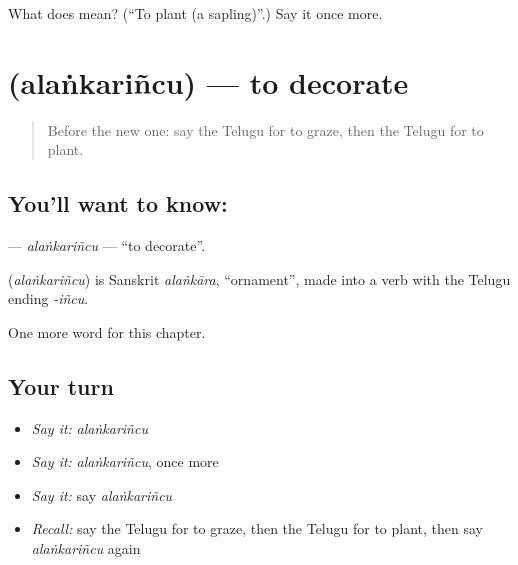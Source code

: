 \begin{tcolorbox}[breakable,colback=teal!4,colframe=teal!35!black,title={Before you move on}]
What does  mean? (\textquotedblleft{}To plant (a sapling)\textquotedblright{}.) Say it once more.
\end{tcolorbox}
\section[\texorpdfstring{\te{అలంకరించు} (alaṅkariñcu)}{అలంకరించు (alaṅkariñcu)}]{ (alaṅkariñcu) — to decorate}

\label{lesson:TE-C282-alankarincu}



\begin{quote}
Before the new one: say the Telugu for to graze, then the Telugu for to plant.
\end{quote}

\subsection*{You'll want to know: }
\textbf{} — \emph{alaṅkariñcu} — \textquotedblleft{}to decorate\textquotedblright{}.

\begin{cousinweb}
\textbf{} (\emph{alaṅkariñcu}) is Sanskrit \emph{alaṅkāra}, \textquotedblleft{}ornament\textquotedblright{}, made into a verb with the Telugu ending \emph{-iñcu}.
\end{cousinweb}

\begin{grammarlens}[title={What you've built}]
One more word for this chapter.
\end{grammarlens}

\subsection*{Your turn}
\begin{itemize}
\raggedright
  \item \emph{Say it:} \emph{alaṅkariñcu}
  \item \emph{Say it:} \emph{alaṅkariñcu}, once more
  \item \emph{Say it:} say \emph{alaṅkariñcu}
  \item \emph{Recall:} say the Telugu for to graze, then the Telugu for to plant, then say \emph{alaṅkariñcu} again
\end{itemize}

